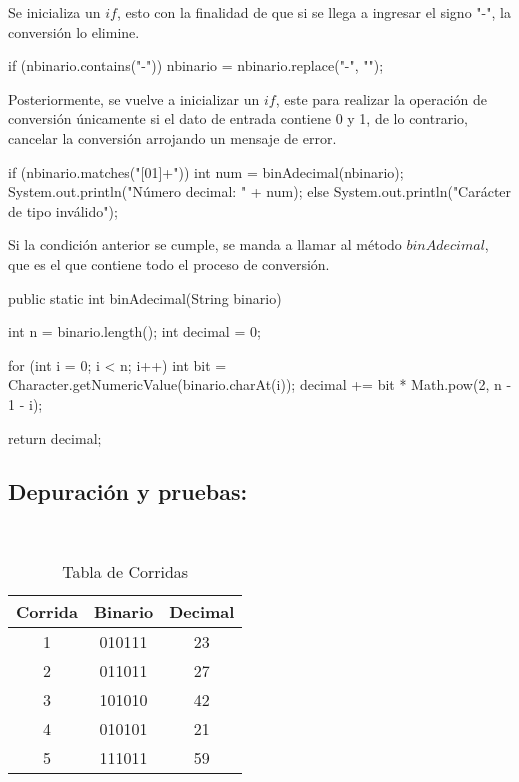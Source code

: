 Se inicializa un $if$, esto con la finalidad de que si se llega a ingresar el signo "-", la conversión lo elimine.

\begin{javaCode}

if (nbinario.contains("-")) {
    nbinario = nbinario.replace("-", "");
    }

\end{javaCode}

Posteriormente, se vuelve a inicializar un $if$, este para realizar la operación de conversión únicamente si el dato de entrada contiene 0 y 1, de lo contrario, cancelar la conversión arrojando un mensaje de error.

\begin{javaCode}

if (nbinario.matches("[01]+")) {
    int num = binAdecimal(nbinario);
    System.out.println("Número decimal: " + num);
    }else{
        System.out.println("Carácter de tipo inválido");
    }
\end{javaCode}

Si la condición anterior se cumple, se manda a llamar al método $binAdecimal$, que es el que contiene todo el proceso de conversión.
\begin{javaCode}

public static int binAdecimal(String binario) {
    int n = binario.length();
    int decimal = 0;
       
    for (int i = 0; i < n; i++) {
        int bit = 
        Character.getNumericValue(binario.charAt(i));
    decimal += bit * Math.pow(2, n - 1 - i);
    }

    return decimal;
}
    
\end{javaCode}

\subsection{\textbf{Depuración y pruebas:}}

\begin{table}[h!]
     \centering
     \caption{Tabla de Corridas}\\
     
     \begin{tabular}{|c|c|c|}
     \hline
        Corrida & Binario & Decimal\\
        \hline
        1  & 010111 & 23\\
        \hline
        2  & 011011 & 27\\
        \hline
        3  & 101010 & 42\\
        \hline
        4  & 010101 & 21\\
        \hline
        5  & 111011 & 59\\
        \hline
     \end{tabular}
     \label{tab:my_label}
 \end{table}
\vspace*{-8pt}